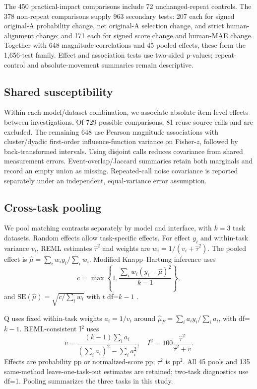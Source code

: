 The 450 practical-impact comparisons include 72 unchanged-repeat controls. The 378 non-repeat comparisons supply 963 secondary tests: 207 each for signed original-A probability change, net original-A selection change, and strict human-alignment change; and 171 each for signed score change and human-MAE change. Together with 648 magnitude correlations and 45 pooled effects, these form the 1,656-test family. Effect and association tests use two-sided p-values; repeat-control and absolute-movement summaries remain descriptive.

\subsection{Shared susceptibility}
\label{app:susceptibility}
Within each model/dataset combination, we associate absolute item-level effects between investigations. Of 729 possible comparisons, 81 reuse source calls and are excluded. The remaining 648 use Pearson magnitude associations with cluster/dyadic first-order influence-function variance on Fisher-$z$, followed by back-transformed intervals. Using disjoint calls reduces covariance from shared measurement errors. Event-overlap/Jaccard summaries retain both marginals and record an empty union as missing. Repeated-call noise covariance is reported separately under an independent, equal-variance error assumption.

\subsection{Cross-task pooling}
\label{app:pooling}
We pool matching contrasts separately by model and interface, with $k=3$ task datasets. Random effects allow task-specific effects. For effect $y_i$ and within-task variance $v_i$, REML estimates $\hat\tau^2$ and weights are $w_i=1/(v_i+\hat\tau^2)$. The pooled effect is $\hat\mu=\sum_iw_i y_i/\sum_iw_i$. Modified Knapp--Hartung inference uses
\begin{equation}
c=\max\left\{1,\frac{\sum_iw_i(y_i-\hat\mu)^2}{k-1}\right\},
\end{equation}
and $\mathrm{SE}(\hat\mu)=\sqrt{c/\sum_iw_i}$ with $t$ df=$k-1$ \citep{rover2015}.

Q uses fixed within-task weights $a_i=1/v_i$ around $\hat\mu_F=\sum_i a_i y_i/\sum_i a_i$, with df=$k-1$. REML-consistent I$^2$ uses
\begin{equation}
\widetilde v=\frac{(k-1)\sum_i a_i}{(\sum_i a_i)^2-\sum_i a_i^2},\quad
I^2=100\frac{\hat\tau^2}{\hat\tau^2+\widetilde v}.
\end{equation}
Effects are probability pp or normalized-score pp; $\tau^2$ is pp$^2$. All 45 pools and 135 same-method leave-one-task-out estimates are retained; two-task diagnostics use df=1. Pooling summarizes the three tasks in this study.

